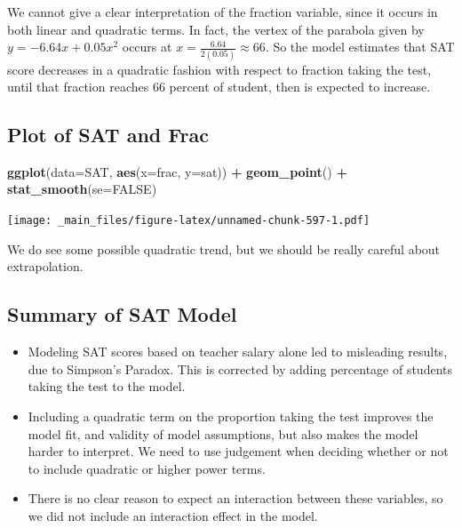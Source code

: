 \documentclass[]{book}
\newenvironment{Shaded}{\begin{snugshade}}{\end{snugshade}}
\newcommand{\KeywordTok}[1]{\textcolor[rgb]{0.13,0.29,0.53}{\textbf{#1}}}
\newcommand{\DataTypeTok}[1]{\textcolor[rgb]{0.13,0.29,0.53}{#1}}
\newcommand{\StringTok}[1]{\textcolor[rgb]{0.31,0.60,0.02}{#1}}
\newcommand{\OtherTok}[1]{\textcolor[rgb]{0.56,0.35,0.01}{#1}}
\newcommand{\OperatorTok}[1]{\textcolor[rgb]{0.81,0.36,0.00}{\textbf{#1}}}
\newcommand{\NormalTok}[1]{#1}
\begin{document}
We cannot give a clear interpretation of the fraction variable, since it
occurs in both linear and quadratic terms. In fact, the vertex of the
parabola given by \(y=-6.64x + 0.05x^2\) occurs at
\(x=\frac{6.64}{2(0.05)}\approx 66\). So the model estimates that SAT
score decreases in a quadratic fashion with respect to fraction taking
the test, until that fraction reaches 66 percent of student, then is
expected to increase.

\subsection{Plot of SAT and Frac}\label{plot-of-sat-and-frac}

\begin{Shaded}
\begin{Highlighting}[]
\KeywordTok{ggplot}\NormalTok{(}\DataTypeTok{data=}\NormalTok{SAT, }\KeywordTok{aes}\NormalTok{(}\DataTypeTok{x=}\NormalTok{frac, }\DataTypeTok{y=}\NormalTok{sat)) }\OperatorTok{+}\StringTok{ }\KeywordTok{geom_point}\NormalTok{() }\OperatorTok{+}\StringTok{ }\KeywordTok{stat_smooth}\NormalTok{(}\DataTypeTok{se=}\OtherTok{FALSE}\NormalTok{)}
\end{Highlighting}
\end{Shaded}

\texttt{[image: \_main\_files/figure-latex/unnamed-chunk-597-1.pdf]}

We do see some possible quadratic trend, but we should be really careful
about extrapolation.

\subsection{Summary of SAT Model}\label{summary-of-sat-model}

\begin{itemize}
\item
  Modeling SAT scores based on teacher salary alone led to misleading
  results, due to Simpson's Paradox. This is corrected by adding
  percentage of students taking the test to the model.
\item
  Including a quadratic term on the proportion taking the test improves
  the model fit, and validity of model assumptions, but also makes the
  model harder to interpret. We need to use judgement when deciding
  whether or not to include quadratic or higher power terms.
\item
  There is no clear reason to expect an interaction between these
  variables, so we did not include an interaction effect in the model.
\end{itemize}
\end{document}
